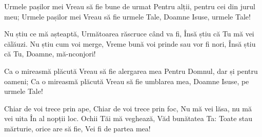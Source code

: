 \beginverse
Urmele pașilor mei
Vreau să fie bune de urmat
Pentru alții, pentru cei din jurul meu;
Urmele pașilor mei
Vreau să fie urmele Tale,
Doamne Isuse, urmele Tale!
\endverse

\beginchorus
Nu știu ce mă așteaptă,
Următoarea răscruce când va fi,
Însă știu că Tu mă vei călăuzi.
Nu știu cum voi merge,
Vreme bună voi prinde sau vor fi nori,
Însă știu că Tu, Doamne, mă-nconjori!
\endchorus

\beginverse
Ca o mireasmă plăcută
Vreau să fie alergarea mea
Pentru Domnul, dar și pentru oameni;
Ca o mireasmă plăcută
Vreau să fie umblarea mea,
Doamne Isuse, pe urmele Tale!
\endverse

\beginverse*
Chiar de voi trece prin ape,
Chiar de voi trece prin foc,
Nu mă vei lăsa, nu mă vei uita
În al nopții loc.
Ochii Tăi mă veghează,
Văd bunătatea Ta:
Toate stau mărturie, orice are să fie,
Vei fi de partea mea!
\endverse
\endsong